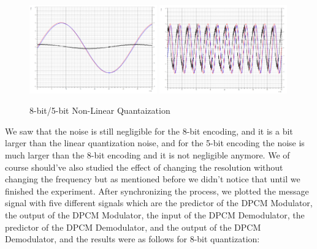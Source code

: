 \documentclass[12pt]{article}
\begin{document}
\begin{figure}[H]
    \centering
    \includegraphics[width=0.49\textwidth]{assets/main/2023-08-26-22-44-32.png}
    \includegraphics[width=0.49\textwidth]{assets/main/2023-08-26-22-44-52.png}
    \caption{8-bit/5-bit Non-Linear Quantaization}
    \label{fig:4}
\end{figure}
We saw that the noise is still negligible for the 8-bit encoding, and it is a bit larger than the linear quantization noise, and for the 5-bit encoding the noise is much larger than the 8-bit encoding and it is not negligible anymore. We of course should've also studied the effect of changing the resolution without changing the frequency but as mentioned before we didn't notice that until we finished the experiment.
After synchronizing the process, we plotted the message signal with five different signals which are the predictor of the DPCM Modulator, the output of the DPCM Modulator, the input of the DPCM Demodulator, the predictor of the DPCM Demodulator, and the output of the DPCM Demodulator, and the results were as follows for 8-bit quantization:
\end{document}
